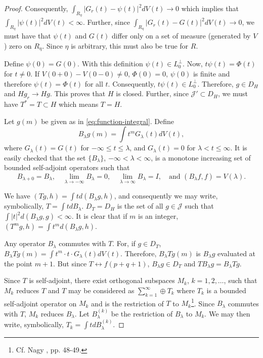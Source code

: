 \documentclass{article}
\begin{document}
\begin{proof}
Consequently, $\int_{R_\eta} |G_r(t) - \psi(t)|^2 dV(t) \to 0$ which implies that $\int_{R_\eta} |\psi(t)|^2 dV(t) < \infty$. Further, since $\int_{R_\eta} |G_r(t) - G(t)|^2 dV(t) \to 0$, we must have that $\psi(t)$ and $G(t)$ differ only on a set of measure (generated by $V$) zero on $R_\eta$. Since $\eta$ is arbitrary, this must also be true for $R$.

Define $\psi(0) = G(0)$. With this definition $\psi(t) \in L_0^{\perp}$. Now, $t\psi(t) = \Phi(t)$ for $t \neq 0$. If $V(0+0) - V(0-0) \neq 0$, $\Phi(0) = 0$, $\psi(0)$ is finite and therefore $\psi(t) = \Phi(t)$ for all $t$. Consequently, $t\psi(t) \in L_0^{\perp}$. Therefore, $g \in D_H$ and $Hg_r \to Hg$. This proves that $H$ is closed. Further, since $\mathcal{J}' \subset D_H$, we must have $T^* = T \subset H$ which means $T = H$.

Let $g(m)$ be given as in \eqref{eq:function-integral}. Define
\begin{equation}
B_\lambda g(m) = \int t^m G_\lambda(t) dV(t),
\label{eq:spectral-family}
\end{equation}
where $G_\lambda(t) = G(t)$ for $-\infty \leq t \leq \lambda$, and $G_\lambda(t) = 0$ for $\lambda < t \leq \infty$. It is easily checked that the set $\{B_\lambda\}$, $-\infty < \lambda < \infty$, is a monotone increasing set of bounded self-adjoint operators such that
\begin{equation}
B_{\lambda+0} = B_\lambda, \quad \lim_{\lambda \to -\infty} B_\lambda = 0, \quad \lim_{\lambda \to \infty} B_\lambda = I, \quad \text{and } (B_\lambda f, f) = V(\lambda).
\label{eq:spectral-properties}
\end{equation}

We have $(Tg, h) = \int t d(B_\lambda g, h)$, and consequently we may write, symbolically, $T = \int t dB_\lambda$. $D_T = D_H$ is the set of all $g \in \mathcal{J}$ such that $\int |t|^2 d(B_\lambda g, g) < \infty$. It is clear that if $m$ is an integer, $(T^m g, h) = \int t^m d(B_\lambda g, h)$.

Any operator $B_\lambda$ commutes with $T$. For, if $g \in D_T$, $B_\lambda Tg(m) = \int t^m \cdot t \cdot G_\lambda(t) dV(t)$. Therefore, $B_\lambda Tg(m)$ is $B_\lambda g$ evaluated at the point $m+1$. But since $T \leftrightarrow f(p+q+1)$, $B_\lambda g \in D_T$ and $TB_\lambda g = B_\lambda Tg$.

Since $T$ is self-adjoint, there exist orthogonal subspaces $M_k$, $k = 1, 2, \ldots$, such that $M_k$ reduces $T$ and $T$ may be considered as $\sum_{k=1}^{\infty} \oplus T_k$ where $T_k$ is a bounded self-adjoint operator on $M_k$ and is the restriction of $T$ to $M_k$\footnote{Cf. Nagy \cite{nagy}, pp. 48-49.}. Since $B_\lambda$ commutes with $T$, $M_k$ reduces $B_\lambda$. Let $B_\lambda^{(k)}$ be the restriction of $B_\lambda$ to $M_k$. We may then write, symbolically, $T_k = \int t dB_\lambda^{(k)}$.


\end{proof}
\end{document}

